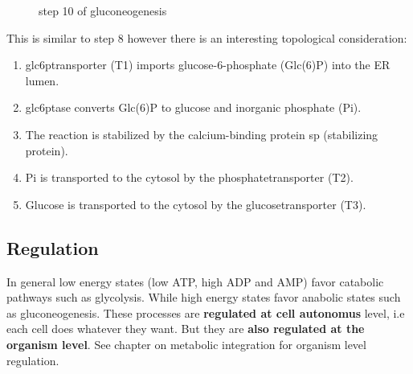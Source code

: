 \documentclass[../main.tex]{subfiles}
\begin{document}
\begin{figure}[H]
	\centering
	\caption{step 10 of gluconeogenesis}
\end{figure}
This is similar to step 8 however there is an interesting topological consideration:
\begin{enumerate}
    \item \gls{glc6ptransporter} (T1) imports glucose-6-phosphate (Glc(6)P) into the ER lumen.
    \item \gls{glc6ptase} converts Glc(6)P to glucose and inorganic phosphate (Pi).
    \item The reaction is stabilized by the calcium-binding protein \gls{sp} (stabilizing protein).
    \item Pi is transported to the cytosol by the \gls{phosphatetransporter} (T2).
    \item Glucose is transported to the cytosol by the \gls{glucosetransporter} (T3).
\end{enumerate}

\subsection{Regulation}
\begin{remark}
    In general low energy states (low ATP, high ADP and  AMP) favor catabolic pathways such as glycolysis. While high energy states favor anabolic states such as gluconeogenesis. These processes are\textbf{ regulated at cell autonomus} level, i.e each cell does whatever they want. But they are \textbf{also regulated at the organism level}. See chapter on metabolic integration for organism level regulation. 
\end{remark}
\end{document}
